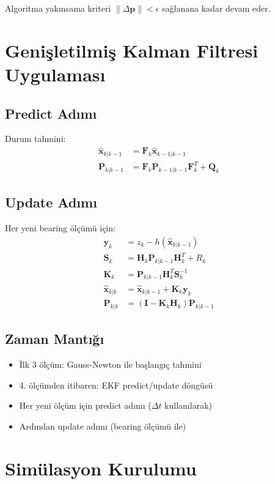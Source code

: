 \documentclass[12pt,a4paper]{article}
\begin{document}
Algoritma yakınsama kriteri $\|\Delta \mathbf{p}\| < \epsilon$ sağlanana kadar devam eder.

\section{Genişletilmiş Kalman Filtresi Uygulaması}

\subsection{Predict Adımı}
Durum tahmini:
\begin{align}
\hat{\mathbf{x}}_{k|k-1} &= \mathbf{F}_k \hat{\mathbf{x}}_{k-1|k-1} \\
\mathbf{P}_{k|k-1} &= \mathbf{F}_k \mathbf{P}_{k-1|k-1} \mathbf{F}_k^T + \mathbf{Q}_k
\end{align}

\subsection{Update Adımı}
Her yeni bearing ölçümü için:
\begin{align}
\mathbf{y}_k &= z_k - h(\hat{\mathbf{x}}_{k|k-1}) \\
\mathbf{S}_k &= \mathbf{H}_k \mathbf{P}_{k|k-1} \mathbf{H}_k^T + R_k \\
\mathbf{K}_k &= \mathbf{P}_{k|k-1} \mathbf{H}_k^T \mathbf{S}_k^{-1} \\
\hat{\mathbf{x}}_{k|k} &= \hat{\mathbf{x}}_{k|k-1} + \mathbf{K}_k \mathbf{y}_k \\
\mathbf{P}_{k|k} &= (\mathbf{I} - \mathbf{K}_k \mathbf{H}_k) \mathbf{P}_{k|k-1}
\end{align}

\subsection{Zaman Mantığı}
\begin{itemize}
    \item İlk 3 ölçüm: Gauss-Newton ile başlangıç tahmini
    \item 4. ölçümden itibaren: EKF predict/update döngüsü
    \item Her yeni ölçüm için predict adımı ($\Delta t$ kullanılarak)
    \item Ardından update adımı (bearing ölçümü ile)
\end{itemize}

\section{Simülasyon Kurulumu}
\end{document}
